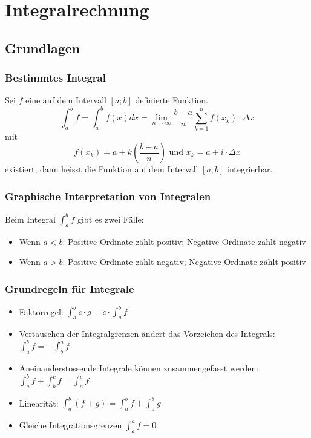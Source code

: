\section{Integralrechnung}
\subsection{Grundlagen}
\subsubsection{Bestimmtes Integral}
Sei $f$ eine auf dem Intervall $[a;b]$ definierte Funktion.
\[ \int^b_a f = \int^b _a f(x) dx =
  \lim_{n \to \infty} \frac{b-a}{n} \sum_{k=1}^{n}f(x_k) \cdot \Delta x
\]
mit
\[ f(x_k) = a + k\left(\frac{b-a}{n}\right) \text{ und }
  x_k = a + i \cdot \Delta x\]
existiert, dann heisst die Funktion auf dem Intervall $[a;b]$
integrierbar.

\subsubsection{Graphische Interpretation von Integralen}
Beim Integral $\int_{a}^{b}f$ gibt es zwei Fälle:
\begin{itemize}
  \item Wenn $a < b$: Positive Ordinate zählt positiv;
    Negative Ordinate zählt negativ
  \item Wenn $a > b$: Positive Ordinate zählt negativ;
    Negative Ordinate zählt positiv
\end{itemize}

\subsubsection{Grundregeln für Integrale}
\begin{itemize}
  \item Faktorregel: $\int_{a}^{b}c \cdot g = c \cdot \int_{a}^{b}f$
  \item Vertauschen der Integralgrenzen ändert das Vorzeichen des Integrals:
    $\int_{a}^{b}f = - \int_{b}^{a}f$
  \item Aneinanderstossende Integrale können zusammengefasst werden:
    $\int_{a}^{b}f + \int_{b}^{c}f = \int_{a}^{c}f$
  \item Linearität: $\int_{a}^{b}(f+g) = \int_{a}^{b}f + \int_{a}^{b}g$
  \item Gleiche Integrationsgrenzen $\int_{a}^{a} f = 0$
\end{itemize}

